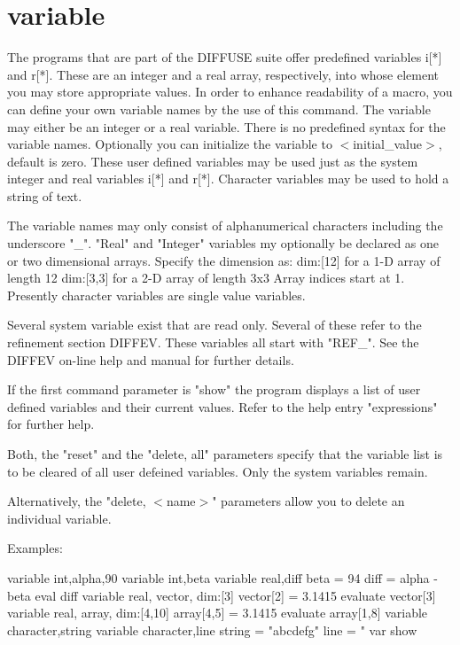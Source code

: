 \section{variable}
\begin{MacVerbatim}
variable {"integer"|"real"},<name> [,<initial_value>] [,dim:[d1,d2]]
variable {"character"},<name>
variable show
variable reset
variable delete {,"all"| <name>..]
\end{MacVerbatim}
The programs that are part of the DIFFUSE suite offer predefined 
variables i[*] and r[*]. These are an integer and a real 
array, respectively, into whose element you may store appropriate 
values. 
In order to enhance readability of a macro, you can define your 
own variable names by the use of this command. The variable may 
either be an integer or a real variable. There is no predefined 
syntax for the variable names. Optionally you can initialize the 
variable to $ <$initial\_value$> $, default is zero. These user defined 
variables may be used just as the system integer and real 
variables i[*] and r[*]. 
Character variables may be used to hold a string of text. 
\par
The variable names may only consist of alphanumerical characters 
including the underscore "\_". 
"Real" and "Integer" variables my optionally be declared as 
one or two dimensional arrays. Specify the dimension as: 
dim:[12]  for a 1-D array of length 12 
dim:[3,3] for a 2-D array of length 3x3 
Array indices start at 1. 
Presently character variables are single value variables. 
\par
Several system variable exist that are read only. Several of 
these refer to the refinement section DIFFEV. These variables 
all start with "REF\_". See the DIFFEV on-line help and manual 
for further details. 
\par
If the first command parameter is "show" the program displays a 
list of user defined variables and their current values. 
Refer to the help entry "expressions" for further help. 
\par
Both, the "reset" and the "delete, all" parameters specify that 
the variable list is to be cleared of all user defeined variables. 
Only the system variables remain. 
\par
Alternatively, the "delete, $ <$name$> $" parameters allow you to delete 
an individual variable. 
\par
Examples: 
\begin{MacVerbatim}
variable  int,alpha,90
variable  int,beta
variable  real,diff
beta = 94
diff = alpha - beta
eval diff
variable real, vector, dim:[3]
vector[2] = 3.1415
evaluate vector[3]
variable real, array, dim:[4,10]
array[4,5] = 3.1415
evaluate array[1,8]
variable  character,string
variable  character,line
string = "abcdefg"
line   = "%
var show
\end{MacVerbatim}

